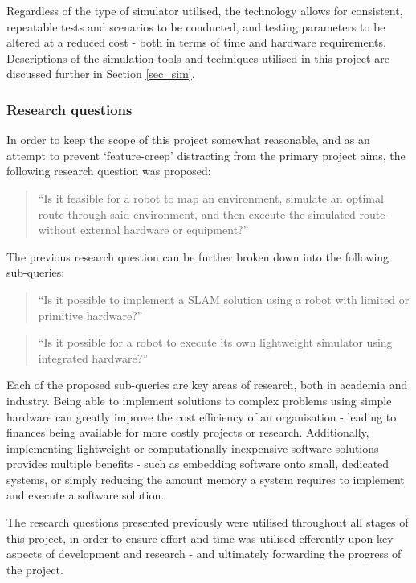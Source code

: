 Regardless of the type of simulator utilised, the technology allows for
consistent, repeatable tests and scenarios to be conducted, and testing
parameters to be altered at a reduced cost - both in terms of time and
hardware requirements.
Descriptions of the simulation tools and techniques utilised in this project
are discussed further in Section \ref{sec_sim}.


\subsubsection{Research questions} \label{sec_res_q}
In order to keep the scope of this project somewhat reasonable, and as an
attempt to prevent `feature-creep' distracting from the primary project aims,
the following research question was proposed:
\begin{quote}
    ``Is it feasible for a robot to map an environment, simulate an optimal
    route through said environment, and then execute the simulated route -
    without external hardware or equipment?''
\end{quote}

The previous research question can be further broken down into the following
sub-queries:

\begin{quote}
    ``Is it possible to implement a SLAM solution using a robot with limited or
    primitive hardware?''
\end{quote}

\begin{quote}
    ``Is it possible for a robot to execute its own lightweight simulator using
    integrated hardware?''
\end{quote}

Each of the proposed sub-queries are key areas of research, both in academia
and industry.
Being able to implement solutions to complex problems using simple hardware
can greatly improve the cost efficiency of an organisation - leading to
finances being available for more costly projects or research. 
Additionally, implementing lightweight or computationally inexpensive software
solutions provides multiple benefits - such as embedding software onto small,
dedicated systems, or simply reducing the amount memory a system requires to
implement and execute a software solution. 

The research questions presented previously were utilised throughout all
stages of this project, in order to ensure effort and time was utilised
efferently upon key aspects of development and research - and ultimately
forwarding the progress of the project.

